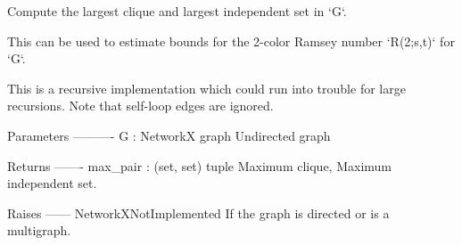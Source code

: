 \begin{DoxyVerb}Compute the largest clique and largest independent set in `G`.

This can be used to estimate bounds for the 2-color
Ramsey number `R(2;s,t)` for `G`.

This is a recursive implementation which could run into trouble
for large recursions. Note that self-loop edges are ignored.

Parameters
----------
G : NetworkX graph
    Undirected graph

Returns
-------
max_pair : (set, set) tuple
    Maximum clique, Maximum independent set.

Raises
------
NetworkXNotImplemented
    If the graph is directed or is a multigraph.
\end{DoxyVerb}
 